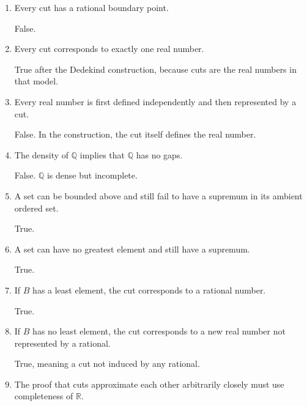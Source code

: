 \documentclass{self-check}
\begin{document}
\begin{enumerate}[label=\arabic{*}., itemsep=10pt]
    \begin{answer}
      Ambiguous. Geometrically yes after embedding into \(\mathbb{R}\); not necessarily as a rational point.
    \end{answer}
  \item Every cut has a rational boundary point.

    \begin{answer}
      False.
    \end{answer}
  \item Every cut corresponds to exactly one real number.

    \begin{answer}
      True after the Dedekind construction, because cuts are the real numbers in that model.
    \end{answer}
  \item Every real number is first defined independently and then represented by a cut.

    \begin{answer}
      False. In the construction, the cut itself defines the real number.
    \end{answer}
  \item The density of \(\mathbb{Q}\) implies that \(\mathbb{Q}\) has no gaps.

    \begin{answer}
      False. \(\mathbb{Q}\) is dense but incomplete.
    \end{answer}
  \item A set can be bounded above and still fail to have a supremum in its ambient ordered set.

    \begin{answer}
      True.
    \end{answer}
  \item A set can have no greatest element and still have a supremum.

    \begin{answer}
      True.
    \end{answer}
  \item If \(B\) has a least element, the cut corresponds to a rational number.

    \begin{answer}
      True.
    \end{answer}
  \item If \(B\) has no least element, the cut corresponds to a new real number not represented by a rational.

    \begin{answer}
      True, meaning a cut not induced by any rational.
    \end{answer}
  \item The proof that cuts approximate each other arbitrarily closely must use completeness of \(\mathbb{R}\).


\end{enumerate}
\end{document}
